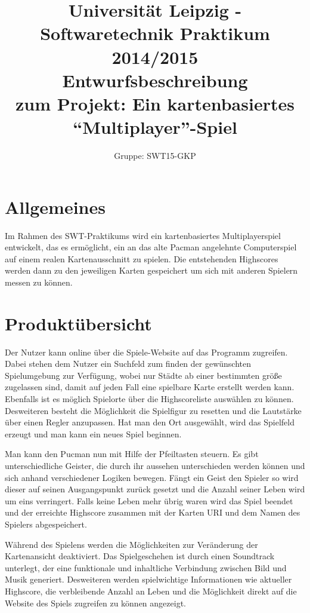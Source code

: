\documentclass[11pt,a4paper]{article}
\author{Gruppe: SWT15-GKP}
\title{Universität Leipzig - Softwaretechnik Praktikum 2014/2015 \\  Entwurfsbeschreibung \\ zum Projekt: Ein kartenbasiertes “Multiplayer”-Spiel}
\begin{document}
\maketitle

\clearpage

\tableofcontents

\clearpage

\flushleft
\section{Allgemeines}
Im Rahmen des SWT-Praktikums wird ein kartenbasiertes Multiplayerspiel entwickelt, das es ermöglicht, ein an das alte Pacman angelehnte Computerspiel auf einem realen Kartenausschnitt zu spielen. Die entstehenden Highscores werden dann zu den jeweiligen Karten gespeichert um sich mit anderen Spielern messen zu können.


\section{Produktübersicht}
Der Nutzer kann online über die Spiele-Website auf das Programm zugreifen.
Dabei stehen dem Nutzer ein Suchfeld zum finden der gewünschten Spielumgebung zur Verfügung, wobei nur Städte ab einer bestimmten größe zugelassen sind, damit auf jeden Fall eine spielbare Karte erstellt werden kann. Ebenfalls ist es möglich Spielorte über die Highscoreliste auswählen zu können. Desweiteren besteht die Möglichkeit die Spielfigur zu resetten und die Lautstärke über einen Regler anzupassen.
Hat man den Ort ausgewählt, wird das Spielfeld erzeugt und man kann ein neues Spiel beginnen. 

Man kann den Pucman nun mit Hilfe der Pfeiltasten steuern.
Es gibt unterschiedliche Geister, die durch ihr aussehen unterschieden werden können und sich anhand verschiedener Logiken bewegen. Fängt ein Geist den Spieler so wird dieser auf seinen Ausgangspunkt zurück gesetzt und die Anzahl seiner Leben wird um eins verringert. Falls keine Leben mehr übrig waren wird das Spiel beendet und der erreichte Highscore zusammen mit der Karten URI und dem Namen des Spielers abgespeichert.

Während des Spielens werden die Möglichkeiten zur Veränderung der Kartenansicht deaktiviert. Das Spielgeschehen ist durch einen Soundtrack unterlegt, der eine funktionale und inhaltliche Verbindung zwischen Bild und Musik generiert.
Desweiteren werden spielwichtige Informationen wie aktueller Highscore, die verbleibende Anzahl an Leben und die Möglichkeit direkt auf die Website des Spiels zugreifen zu können angezeigt.
\clearpage
\end{document}
